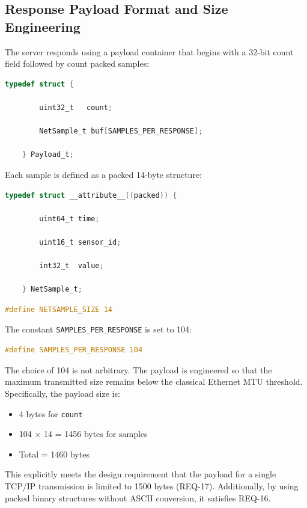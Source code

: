 \subsection{Response Payload Format and Size Engineering}

The server responds using a payload container that begins with a 32-bit count field followed by count packed samples:

\begin{lstlisting}[language=C]
	typedef struct {
		
		uint32_t   count;
		
		NetSample_t buf[SAMPLES_PER_RESPONSE];
		
	} Payload_t;
\end{lstlisting}

Each sample is defined as a packed 14-byte structure:

\begin{lstlisting}[language=C]
	typedef struct __attribute__((packed)) {
		
		uint64_t time;
		
		uint16_t sensor_id;
		
		int32_t  value;
		
	} NetSample_t;
\end{lstlisting}

\begin{lstlisting}[language=C]
	#define NETSAMPLE_SIZE 14
\end{lstlisting}

The constant \texttt{SAMPLES\_PER\_RESPONSE} is set to 104:

\begin{lstlisting}[language=C]
	#define SAMPLES_PER_RESPONSE 104
\end{lstlisting}

The choice of 104 is not arbitrary. The payload is engineered so that the maximum transmitted size remains below the classical Ethernet MTU threshold. Specifically, the payload size is:

\begin{itemize}
	\item 4 bytes for \texttt{count}
	\item 104 × 14 = 1456 bytes for samples
	\item Total = 1460 bytes
\end{itemize}

This explicitly meets the design requirement that the payload for a single TCP/IP transmission is limited to 1500 bytes (REQ-17). Additionally, by using packed binary structures without ASCII conversion, it satisfies REQ-16.

